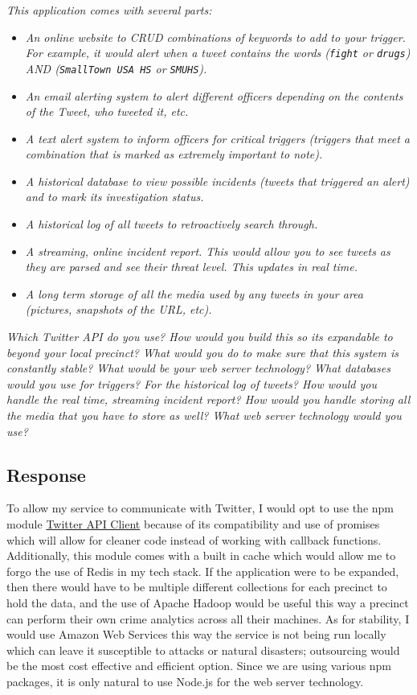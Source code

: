 \documentclass[11pt]{article}
\begin{document}
	\textit{This application comes with several parts:}
	\begin{itemize}
		\item \textit{An online website to CRUD combinations of keywords to add to your trigger. For example, it would alert when a tweet contains the words (\texttt{fight} or \texttt{drugs}) AND (\texttt{SmallTown USA HS} or \texttt{SMUHS}).}
		\item \textit{An email alerting system to alert different officers depending on the contents of the Tweet, who tweeted it, etc.}
		\item \textit{A text alert system to inform officers for critical triggers (triggers that meet a combination that is marked as extremely important to note).}
		\item \textit{A historical database to view possible incidents (tweets that triggered an alert) and to mark its investigation status.}
		\item \textit{A historical log of all tweets to retroactively search through.}
		\item \textit{A streaming, online incident report. This would allow you to see tweets as they are parsed and see their threat level. This updates in real time.}
		\item \textit{A long term storage of all the media used by any tweets in your area (pictures, snapshots of the URL, etc).}
	\end{itemize}

	\textit{Which Twitter API do you use? How would you build this so its expandable to beyond your local precinct? What would you do to make sure that this system is constantly stable? What would be your web server technology? What databases would you use for triggers? For the historical log of tweets? How would you handle the real time, streaming incident report? How would you handle storing all the media that you have to store as well? What web server technology would you use?}

	\subsection*{Response}
	To allow my service to communicate with Twitter, I would opt to use the npm module \href{https://www.npmjs.com/package/twitter-api-client}{Twitter API Client} because of its compatibility and use of promises which will allow for cleaner code instead of working with callback functions. Additionally, this module comes with a built in cache which would allow me to forgo the use of Redis in my tech stack. If the application were to be expanded, then there would have to be multiple different collections for each precinct to hold the data, and the use of Apache Hadoop would be useful this way a precinct can perform their own crime analytics across all their machines. As for stability, I would use Amazon Web Services this way the service is not being run locally which can leave it susceptible to attacks or natural disasters; outsourcing would be the most cost effective and efficient option. Since we are using various npm packages, it is only natural to use Node.js for the web server technology. 
\end{document}
